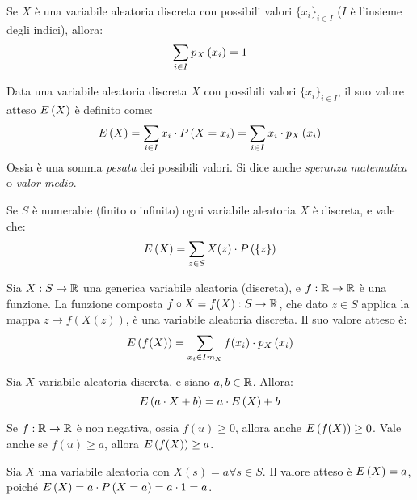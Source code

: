 \begin{prop}
Se $X$ \`e una variabile aleatoria discreta con possibili valori $\{x_i\}_{i \in I}$ ($I$ \`e l'insieme degli indici), allora:
\[
\sum_{i \in I} p_{X} \left( x_i \right) = 1
\]
\end{prop}

\begin{defn}
Data una variabile aleatoria discreta $X$ con possibili valori $\{x_i\}_{i \in I}$, il suo valore atteso $E \left( X \right)$ \`e definito come:
\[
E \left( X \right) = \sum_{i \in I} x_i \cdot P \left( {X = x_i} \right) = \sum_{i \in I} x_i \cdot p_{X} \left( x_i \right)
\]
Ossia \`e una somma \emph{pesata} dei possibili valori. Si dice anche \emph{speranza matematica} o \emph{valor medio}.
\end{defn}

\begin{prop}
Se $S$ \`e numerabie (finito o infinito) ogni variabile aleatoria $X$ \`e discreta, e vale che:
\[
E \left( X \right) = \sum_{z \in S} X(z) \cdot P \left( {\{z\}} \right)
\]
\end{prop}

\begin{fact}
Sia $X : S \to \mathbb{R}$ una generica variabile aleatoria (discreta), e $f : \mathbb{R} \to \mathbb{R}$ \`e una funzione. La funzione composta $f \circ X = f(X) : S \to \mathbb{R}$, che dato $z \in S$ applica la mappa $z \mapsto f(X(z))$, \`e una variabile aleatoria discreta. Il suo valore atteso \`e:
\[
E \left( f(X) \right) = \sum_{x_i \in Im_{X}} f(x_i) \cdot p_{X} \left( x_i \right)
\]
\end{fact}

\begin{prop}
Sia $X$ variabile aleatoria discreta, e siano $a, b \in \mathbb{R}$. Allora:
\[
E \left( a \cdot X + b \right) = a \cdot E \left( X \right) + b
\]
\end{prop}

\begin{fact}
Se $f : \mathbb{R} \to \mathbb{R}$ \`e non negativa, ossia $f(u) \ge 0$, allora anche $E \left( f(X) \right) \ge 0$. Vale anche se $f(u) \ge a$, allora $E \left( f(X) \right) \ge a$.
\end{fact}

\begin{defn}
Sia $X$ una variabile aleatoria con $X(s) = a \forall s \in S$. Il valore atteso \`e $E \left( X \right) = a$, poich\'e $E \left( X \right) = a \cdot P \left( {X = a} \right) = a \cdot 1 = a$.
\end{defn}

